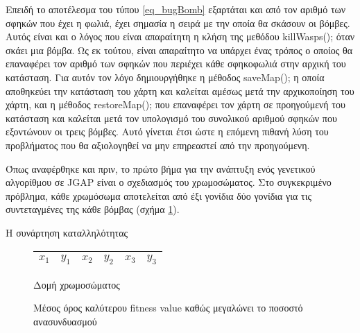 Επειδή το αποτέλεσμα του τύπου \ref{eq_bugBomb} εξαρτάται και από τον αριθμό των σφηκών που έχει η φωλιά, έχει σημασία η σειρά με την οποία θα σκάσουν οι βόμβες. Αυτός είναι και ο λόγος που είναι απαραίτητη η κλήση της μεθόδου killWasps(); όταν σκάει μια βόμβα. Ως εκ τούτου, είναι απαραίτητο να υπάρχει ένας τρόπος ο οποίος θα επαναφέρει τον αριθμό των σφηκών που περιέχει κάθε σφηκοφωλιά στην αρχική του κατάσταση. Για αυτόν τον λόγο δημιουργήθηκε η μέθοδος saveMap(); η οποία αποθηκεύει την κατάσταση του χάρτη και καλείται αμέσως μετά την αρχικοποίηση του χάρτη, και η μέθοδος restoreMap(); που επαναφέρει τον χάρτη σε προηγούμενή του κατάσταση και καλείται μετά τον υπολογισμό του συνολικού αριθμού σφηκών που εξοντώνουν οι τρεις βόμβες. Αυτό γίνεται έτσι ώστε η επόμενη πιθανή λύση του προβλήματος που θα αξιολογηθεί να μην επηρεαστεί από την προηγούμενη.

Όπως αναφέρθηκε και πριν, το πρώτο βήμα για την ανάπτυξη ενός γενετικού αλγορίθμου σε JGAP είναι ο σχεδιασμός του χρωμοσώματος. Στο συγκεκριμένο πρόβλημα, κάθε χρωμόσωμα αποτελείται από έξι γονίδια \textemdash{} δύο γονίδια για τις συντεταγμένες της κάθε βόμβας (σχήμα \ref{fig_chromosomeStructure}).

Η συνάρτηση καταλληλότητας

\begin{figure}[!t]
    \centering
    \begin{tabular}{|c|c|c|c|c|c|}
        \hline
        $x_1$ & $y_1$ & $x_2$ & $y_2$ & $x_3$ & $y_3$\\
        \hline
    \end{tabular}
    \caption{Δομή χρωμοσώματος}
    \label{fig_chromosomeStructure}
\end{figure}

\begin{figure}[!t]
    \centering
    \caption{Μέσος όρος καλύτερου fitness value καθώς μεγαλώνει το ποσοστό ανασυνδυασμού}
    \label{fig_crossover}
\end{figure}

